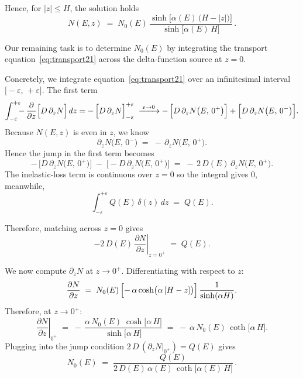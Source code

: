 \begin{solution}
\begin{itemize}
Hence, for \(\lvert z\rvert \le H\), the solution holds
\begin{equation}\label{eq:NZ21}
\boxed{N(E,z) \;=\; N_0(E)\, \frac{\sinh\bigl[\alpha(E)\,\bigl(H - \lvert z\rvert\bigr)\bigr]}{\sinh\bigl[\alpha(E)\,H\bigr]}\,.}
\end{equation}

Our remaining task is to determine \(N_0(E)\) by integrating the transport equation~\eqref{eq:transport21} across the delta‐function source at \(z=0\).

Concretely, we integrate equation~\eqref{eq:transport21} over an infinitesimal interval \(\bigl[-\varepsilon,\,+\varepsilon\bigr]\).
%
%
The first term
\[
\int_{-\varepsilon}^{+\varepsilon} 
\!\!\! -\,\frac{\partial}{\partial z}\Bigl[D\,\partial_{z}N\Bigr] \,dz 
=
-\,\Bigl[D\,\partial_{z}N\Bigr]_{-\varepsilon}^{+\varepsilon}
\;\xrightarrow{\;\varepsilon\to 0\;} 
-\,\Bigl[D\,\partial_{z}N\bigl(E,\,0^{+}\bigr)\Bigr] 
+ \Bigl[D\,\partial_{z}N\bigl(E,\,0^{-}\bigr)\Bigr].
\]
Because \(N(E,z)\) is even in \(z\), we know
\[
\partial_{z}N\bigl(E,\,0^{-}\bigr) 
\;=\; -\,\partial_{z}N\bigl(E,\,0^{+}\bigr).
\]
Hence the jump in the first term becomes
\[
-\,\bigl[D\,\partial_{z}N\bigl(E,\,0^{+}\bigr)\bigr] \;-\; \bigl[-D\,\partial_{z}N\bigl(E,\,0^{+}\bigr)\bigr]
\;=\; -\,2\,D(E)\,\partial_{z}N\bigl(E,\,0^{+}\bigr).
\]
The inelastic‐loss term is continuous over \( z = 0 \) so the integral gives 0, meanwhile,
\[
\int_{-\varepsilon}^{+\varepsilon} Q(E)\,\delta(z)\,dz \;=\; Q(E).
\]

Therefore, matching across \(z=0\) gives
\[
-2\,D(E)\,\left.\frac{\partial N}{\partial z}\right\lvert_{z=0^{+}} 
\;=\; Q(E).
\]

We now compute \(\partial_{z}N\) at \(z \to 0^{+}\).  
%
Differentiating with respect to \(z\):
\[
\frac{\partial N}{\partial z} 
\;=\; N_0(E)
\,\Bigl[-\,\alpha\cosh\bigl(\alpha\,[H - z]\bigr)\Bigr]
\,\frac{1}{\sinh(\alpha H)}.
\]
Therefore, at \(z \to 0^{+}\):
\[
\left.\frac{\partial N}{\partial z}\right\lvert_{0^{+}}
\;=\; -\,\frac{\alpha\,N_0(E)\;\cosh\bigl[\alpha\,H\bigr]}
          {\sinh\bigl[\alpha\,H\bigr]}
\;=\; -\,\alpha\,N_0(E)\,\coth\bigl[\alpha\,H\bigr].
\]
Plugging into the jump condition \(2\,D\,(\partial_{z}N|_{0^{+}})=Q(E)\) gives
\begin{equation}\label{eq:N021}
\boxed{N_0(E)\;=\;\frac{Q(E)}{2\,D(E)\,\alpha(E)\,\coth\bigl[\alpha(E)\,H\bigr]}\,.}
\end{equation}


\end{itemize}
\end{solution}
